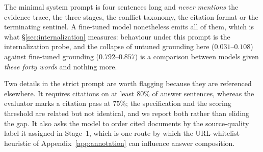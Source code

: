\begin{table}[htbp]
\caption{The three end-to-end instruction strengths, measured by system-prompt
length.}
\label{tab:promptladder}
\end{table}

The minimal system prompt is four sentences long and \emph{never mentions} the
evidence trace, the three stages, the conflict taxonomy, the citation format or
the terminating sentinel. A fine-tuned model nonetheless emits all of them, which
is what \S\ref{sec:internalization} measures: behaviour under this prompt is the
internalization probe, and the collapse of untuned grounding here
($0.031$--$0.108$) against fine-tuned grounding ($0.792$--$0.857$) is a comparison
between models given \emph{these forty words} and nothing more.

Two details in the strict prompt are worth flagging because they are referenced
elsewhere. It requires citations on at least $80\%$ of answer sentences, whereas
the evaluator marks a citation pass at $75\%$; the specification and the scoring
threshold are related but not identical, and we report both rather than eliding
the gap. It also asks the model to order cited documents by the source-quality
label it assigned in Stage~1, which is one route by which the URL-whitelist
heuristic of Appendix~\ref{app:annotation} can influence answer composition.

